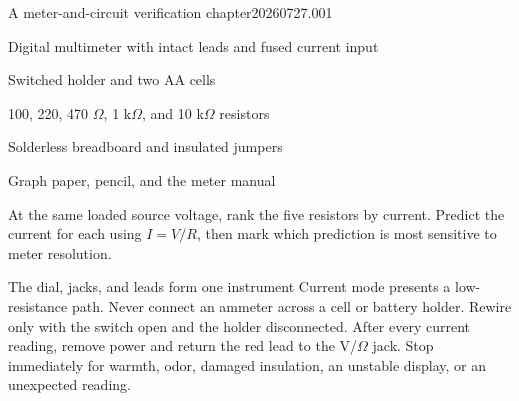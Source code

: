 

  {A meter-and-circuit verification chapter}{20260727.001}

\newcommand{\writein}[1]{\rule{#1}{.35pt}}
\newcommand{\dmm}[3]{%
  \node[draw,very thick,rounded corners=2pt,minimum width=1.18cm,
    minimum height=.72cm,align=center,font=\scriptsize] (#1) at #2 {#3};}
\newcommand{\closed}[3]{%
  \draw[wire] (#1,#2)--(#1+.25,#2);
  \fill (#1+.25,#2) circle (.04);
  \draw[wirethick] (#1+.25,#2)--(#1+.75,#2);
  \fill (#1+.75,#2) circle (.04);
  \draw[wire] (#1+.75,#2)--(#1+1,#2);
  \node[ckt,above]at(#1+.5,#2+.1){#3};}
\newcommand{\metercaption}[1]{\par\smallskip\footnotesize #1}



\begin{materials}
\item Digital multimeter with intact leads and fused current input
\item Switched holder and two AA cells
\item 100, 220, 470 \(\Omega\), 1 k\(\Omega\), and 10 k\(\Omega\) resistors
\item Solderless breadboard and insulated jumpers
\item Graph paper, pencil, and the meter manual
\end{materials}

\begin{predict}
At the same loaded source voltage, rank the five resistors by current. Predict
the current for each using \(I=V/R\), then mark which prediction is most
sensitive to meter resolution.
\end{predict}

\begin{teloshazard}{The dial, jacks, and leads form one instrument}
Current mode presents a low-resistance path. Never connect an ammeter across a
cell or battery holder. Rewire only with the switch open and the holder
disconnected. After every current reading, remove power and return the red lead
to the V/\(\Omega\) jack. Stop immediately for warmth, odor, damaged insulation,
an unstable display, or an unexpected reading.
\end{teloshazard}

